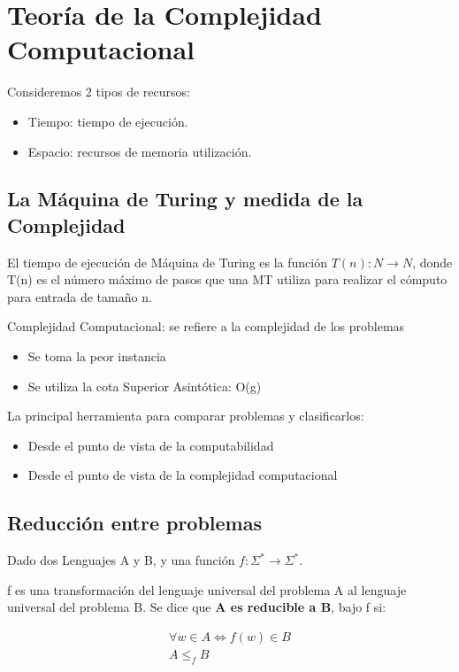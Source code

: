 \chapter{Teoría de la Complejidad Computacional}\label{ch:teoría-de-la-complejidad-computacional}
Consideremos 2 tipos de recursos:
\begin{itemize}
  \item Tiempo: tiempo de ejecución.
  \item Espacio: recursos de memoria utilización.
\end{itemize}

\section{La Máquina de Turing y medida de la Complejidad}
El tiempo de ejecución de Máquina de Turing es la función $T(n): N \rightarrow N$, donde T(n) es el número máximo de pasos que una MT utiliza para realizar el cómputo para entrada de tamaño n.

Complejidad Computacional: se refiere a la complejidad de los problemas
\begin{itemize}
  \item Se toma la peor instancia
  \item Se utiliza la cota Superior  Asintótica: O(g)
\end{itemize}

La principal herramienta para comparar problemas y clasificarlos:
\begin{itemize}
  \item Desde el punto de vista de la computabilidad
  \item Desde el punto de vista de la complejidad computacional
\end{itemize} 

\section{Reducción entre problemas}
Dado dos Lenguajes A y B, y una función $f: \Sigma^* \rightarrow \Sigma^*$.

f es una transformación del lenguaje universal del problema A al lenguaje universal del problema B. Se dice que \textbf{A es reducible a B}, bajo f si:

$$\begin{matrix}
  \forall w \in A \Leftrightarrow f(w)\in B \\ 
  A \leq_f B
\end{matrix}$$

